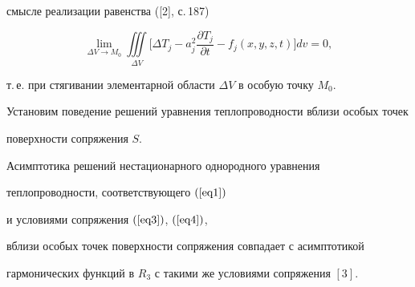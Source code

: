 смысле реализации равенства ([2], с.\,187)


\begin{equation}


\label{eq5}


\lim_{\Delta V \to M_{0}} 


\iiint\limits_{\Delta V}\bigg [


{\Delta T_{j}-a_{j}^{2} \frac{{\partial T_{j}}}{{\partial t}}-f_{j} 


({x,y,z,t})}\bigg]dv=0,


\end{equation} 


т.\,е. при стягивании элементарной области $\Delta V$ в особую точку $M_{0} $.





Установим поведение решений уравнения теплопроводности вблизи особых точек 


поверхности сопряжения $S$.








\begin{lemnonum}


Асимптотика решений нестационарного однородного уравнения 


теплопроводности, соответствующего $(\ref{eq1})$


и условиями сопряжения $(\ref{eq3})$, $(\ref{eq4})$, 


вблизи особых точек поверхности сопряжения совпадает с асимптотикой 


гармонических функций в $R_{3} $ с такими же условиями сопряжения $[3]$.


\end{lemnonum}








